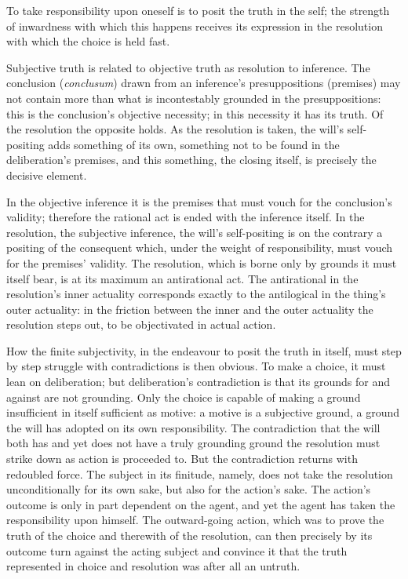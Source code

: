 \documentclass[12pt]{book}
\begin{document}
To take responsibility upon oneself is to posit the truth in the
self; the strength of inwardness with which this happens receives
its expression in the resolution with which the choice is held fast.

Subjective truth is related to objective truth as resolution to
inference.
The conclusion (\textit{conclusum}) drawn from an inference's
presuppositions (premises) may not contain more than what is
incontestably grounded in the presuppositions: this is the
conclusion's objective necessity; in this necessity it has its
truth.
Of the resolution the opposite holds. As the resolution is taken,
the will's self-positing adds something of its own, something not to
be found in the deliberation's premises, and this something, the
closing itself, is precisely the decisive element.

In the objective inference it is the premises that must vouch for
the conclusion's validity; therefore the rational act is ended with
the inference itself. In the resolution, the subjective inference,
the will's self-positing is on the contrary a positing of the
consequent which, under the weight of responsibility, must vouch for
the premises' validity. The resolution, which is borne only by
grounds it must itself bear, is at its maximum an antirational act.
The antirational in the resolution's inner actuality corresponds
exactly to the antilogical in the thing's outer actuality: in the
friction between the inner and the outer actuality the resolution
steps out, to be objectivated in actual action.

How the finite subjectivity, in the endeavour to posit the truth in
itself, must step by step struggle with contradictions is then
obvious. To make a choice, it must lean on deliberation; but
deliberation's contradiction is that its grounds for and against are
not grounding. Only the choice is capable of making a ground
insufficient in itself sufficient as motive: a motive is a
subjective ground, a ground the will has adopted on its own
responsibility. The contradiction that the will both has and yet
does not have a truly grounding ground the resolution must strike
down as action is proceeded to. But the contradiction returns with
redoubled force. The subject in its finitude, namely, does not take
the resolution unconditionally for its own sake, but also for the
action's sake. The action's outcome is only in part dependent on the
agent, and yet the agent has taken the responsibility upon himself.
The outward-going action, which was to prove the truth of the choice
and therewith of the resolution, can then precisely by its outcome
turn
against the acting subject and convince it that the truth
represented in choice and resolution was after all an untruth.
\end{document}
